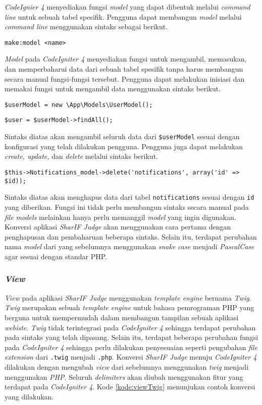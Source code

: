 \begin{enumerate}
\textit{CodeIgnier 4} menyediakan fungsi \textit{model} yang dapat dibentuk melalui \textit{command line} untuk sebuah tabel spesifik. Pengguna dapat membangun \textit{model} melalui \textit{command line} menggunakan sintaks sebagai berikut.
\begin{center}
	\verb|make:model <name>|
\end{center}
\textit{Model} pada \textit{CodeIgniter 4} menyediakan fungsi untuk mengambil, memasukan, dan memperbaharui data dari sebuah tabel spesifik tanpa harus membangun secara manual fungsi-fungsi tersebut. Pengguna dapat melakukan inisiasi dan memakai fungsi untuk mengambil data menggunakan sintaks berikut.
\begin{center}
	\verb|$userModel = new \App\Models\UserModel();|
\end{center}
\begin{center}
	\verb|$user = $userModel->findAll();|
\end{center}
\end{enumerate}

Sintaks diatas akan mengambil seluruh data dari \verb|$userModel| sesuai dengan konfigurasi yang telah dilakukan pengguna. Pengguna juga dapat melakukan \textit{create, update,} dan \textit{delete} melalui sintaks berikut.

\begin{center}
	\verb|$this->Notifications_model->delete('notifications', array('id' => $id));|
\end{center}
Sintaks diatas akan menghapus data dari tabel \texttt{notifications} sesuai dengan \texttt{id} yang diberikan. Fungsi ini tidak perlu membangun sintaks secara manual pada \textit{file} \textit{models} melainkan hanya perlu memanggil \textit{model} yang ingin digunakan. Konversi aplikasi \textit{SharIF Judge} akan menggunakan cara pertama dengan penghapusan dan pembaharuan beberapa sintaks. Selain itu, terdapat perubahan nama \textit{model} dari yang sebelumnya menggunakan \textit{snake case} menjadi \textit{PascalCase} agar sesuai dengan standar PHP.

\subsubsection{\textit{View}}
\textit{View} pada aplikasi \textit{SharIF Judge} menggunakan \textit{template engine} bernama \textit{Twig}. \textit{Twig} merupakan sebuah \textit{template engine} untuk bahasa pemrograman PHP yang berguna untuk mempermudah dalam membangun tampilan sebuah aplikasi \textit{webiste}. \textit{Twig} tidak terintegrasi pada \textit{CodeIgniter 4} sehingga terdapat perubahan pada sintaks yang telah dipasang. Selain itu, terdapat beberapa perubahan fungsi pada \textit{CodeIgniter 4} sehingga perlu dilakukan penyesuaian seperti pengubahan \textit{file extension} dari \texttt{.twig} menjadi \texttt{.php}. Konversi \textit{SharIF Judge} menuju \textit{CodeIgniter 4} dilakukan dengan mengubah \textit{view} dari sebelumnya menggunakan \textit{twig} menjadi menggunakan \textit{PHP}. Seluruh \textit{delimiters} akan diubah menggunakan fitur yang terdapat pada \textit{CodeIgniter 4}. Kode \ref{kode:viewTwig} menunjukan contoh konversi yang dilakukan.

